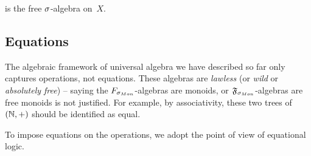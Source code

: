 \begin{proposition}
    \label{prop:free-algebra-construction-is}
     is the free $\sigma$-algebra on~$X$. %
\end{proposition}

\subsection{Equations}
\label{sec:universal-algebra:equations}

The algebraic framework of universal algebra we have described so far only captures operations, not equations.
%
These algebras are \emph{lawless} (or \emph{wild} or \emph{absolutely free}) --
saying the $\SigMon$-algebras are monoids, or $\str{F}_{\sigMon}$-algebras are free monoids is not justified.
%
For example, by associativity, these two trees of $(\mathbb{N}, +)$ should be identified as equal.
\begin{center}
\end{center}
%
To impose equations on the operations, we adopt the point of view of equational logic.

